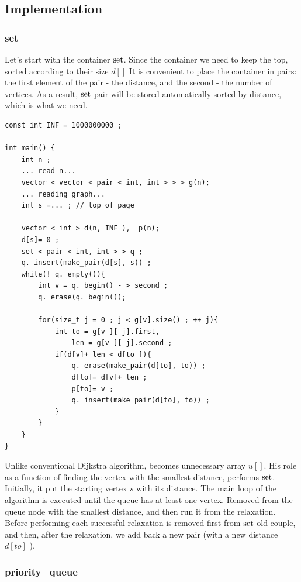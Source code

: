 \subsection{ Implementation }

\subsubsection{ set }

Let's start with the container $\rm set$. Since the container we need to keep the top, sorted according to their size $d []$ It is convenient to place the container in pairs: the first element of the pair - the distance, and the second - the number of vertices. As a result, $\rm set$ pair will be stored automatically sorted by distance, which is what we need.

\begin{verbatim}
const int INF = 1000000000 ;
 
int main() {
    int n ;
    ... read n...
    vector < vector < pair < int, int > > > g(n);
    ... reading graph...
    int s =... ; // top of page
 
    vector < int > d(n, INF ),  p(n);
    d[s]= 0 ;
    set < pair < int, int > > q ;
    q. insert(make_pair(d[s], s)) ;
    while(! q. empty()){
        int v = q. begin() - > second ;
        q. erase(q. begin());
 
        for(size_t j = 0 ; j < g[v].size() ; ++ j){
            int to = g[v ][ j].first,
                len = g[v ][ j].second ;
            if(d[v]+ len < d[to ]){
                q. erase(make_pair(d[to], to)) ;
                d[to]= d[v]+ len ;
                p[to]= v ;
                q. insert(make_pair(d[to], to)) ;
            }
        }
    }
} 
\end{verbatim}
Unlike conventional Dijkstra algorithm, becomes unnecessary array $u []$. His role as a function of finding the vertex with the smallest distance, performs $\rm set$. Initially, it put the starting vertex $s$ with its distance. The main loop of the algorithm is executed until the queue has at least one vertex. Removed from the queue node with the smallest distance, and then run it from the relaxation. Before performing each successful relaxation is removed first from $\rm set$ old couple, and then, after the relaxation, we add back a new pair (with a new distance $d [to]$ ).

\subsubsection{ priority\_queue }


